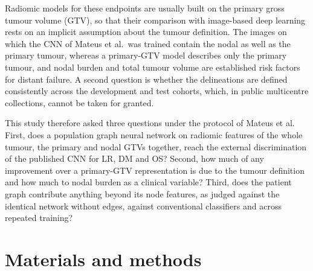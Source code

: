 \documentclass[11pt,a4paper]{article}
\begin{document}
Radiomic models for these endpoints are usually built on the primary gross tumour volume (GTV)\cite{aerts2014,vallieres2017}, so that their comparison with image-based deep learning rests on an implicit assumption about the tumour definition. The images on which the CNN of Mateus et al.\ was trained contain the nodal as well as the primary tumour, whereas a primary-GTV model describes only the primary tumour, and nodal burden and total tumour volume are established risk factors for distant failure\cite{kjems2023volume,jensen2020nodalfdg}. A second question is whether the delineations are defined consistently across the development and test cohorts, which, in public multicentre collections, cannot be taken for granted.

This study therefore asked three questions under the protocol of Mateus et al. First, does a population graph neural network on radiomic features of the whole tumour, the primary and nodal GTVs together, reach the external discrimination of the published CNN for LR, DM and OS? Second, how much of any improvement over a primary-GTV representation is due to the tumour definition and how much to nodal burden as a clinical variable? Third, does the patient graph contribute anything beyond its node features, as judged against the identical network without edges, against conventional classifiers and across repeated training?

\section{Materials and methods}\label{sec:methods}
\end{document}
